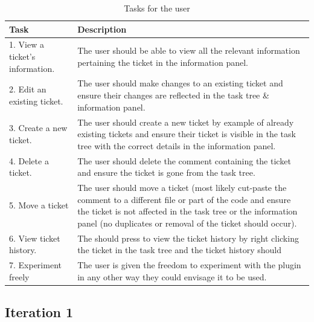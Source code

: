 \documentclass{4thYearProject}
\begin{document}
\begin{table}[H]
\centering
\def\arraystretch{1.5}
\begin{tabular}{p{5cm}p{10cm}}
\hline
Task & Description\\
\hline
1. View a ticket's information. & The user should be able to view all the relevant information pertaining the ticket in the information panel. \\
2. Edit an existing ticket. & The user should make changes to an existing ticket and ensure their changes are reflected in the task tree \& information panel. \\
3. Create a new ticket. & The user should create a new ticket by example of already existing tickets and ensure their ticket is visible in the task tree with the correct details in the information panel.  \\
4. Delete a ticket. & The user should delete the comment containing the ticket and ensure the ticket is gone from the task tree. \\
5. Move a ticket & The user should move a ticket (most likely cut-paste the comment to a different file or part of the code and ensure the ticket is not affected in the task tree or the information panel (no duplicates or removal of the ticket should occur).\\
6. View ticket history. & The should press to view the ticket history by right clicking the ticket in the task tree and the ticket history should \\ 
7. Experiment freely & The user is given the freedom to experiment with the plugin in any other way they could envisage it to be used. \\
\hline
\end{tabular}
\caption{Tasks for the user}
\label{table:userevaltasks}
\end{table}

\subsection{}

\subsection{Iteration 1}
\end{document}
